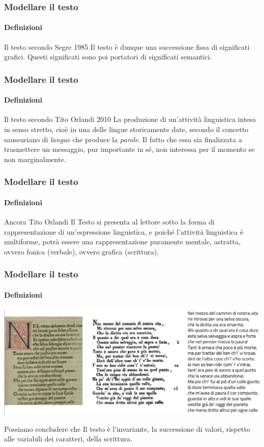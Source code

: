 \begin{frame}
	\frametitle{Modellare il testo}
	\framesubtitle{Definizioni}
	\addtocounter{nframe}{1}

	\begin{block}{Il testo secondo Segre 1985}
		Il testo è dunque una successione fissa di significati grafici. Questi significati sono poi portatori di significati semantici.
	\end{block}

\end{frame}

\begin{frame}
	\frametitle{Modellare il testo}
	\framesubtitle{Definizioni}
	\addtocounter{nframe}{1}

	\begin{block}{Il testo secondo Tito Orlandi 2010}
		La produzione di un'attività linguistica intesa in senso stretto, cioè in una delle lingue storicamente date, secondo il concetto saussuriano di \textit{langue} che produce la \textit{parole}. Il fatto che essa sia finalizzata a trasmettere un messaggio, pur importante in sé, non interessa per il momento se non marginalmente.
	\end{block}

\end{frame}


\begin{frame}
	\frametitle{Modellare il testo}
	\framesubtitle{Definizioni}
	\addtocounter{nframe}{1}

	\begin{block}{Ancora Tito Orlandi}
		Il Testo si presenta al lettore sotto la forma di rappresentazione di un'espressione linguistica, e poiché l'attività linguistica è multiforme, potrà essere una rappresentazione puramente mentale, astratta, ovvero fonica (verbale), ovvero grafica (scrittura).
	\end{block}


\end{frame}


\begin{frame}
	\frametitle{Modellare il testo}
	\framesubtitle{Definizioni}
	\addtocounter{nframe}{1}

	\begin{center}
		\includegraphics[width=.9\textwidth]{imgs/TestoDante.png}
	\end{center}

	\begin{block}{Possiamo concludere che}
		Il testo è l'invariante, la successione di valori, rispetto alle variabili dei caratteri, della scrittura.
	\end{block}

\end{frame}


